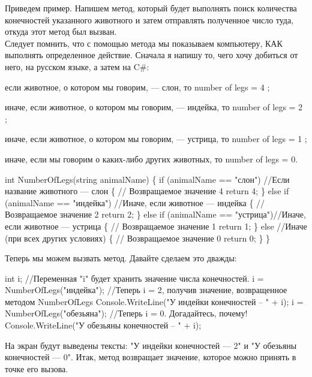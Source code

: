 \documentclass[12pt, a4paper]{article}
\begin{document}
Приведем пример. Напишем метод, который будет выполнять поиск количества конечностей указанного животного и затем отправлять полученное число туда, откуда этот метод был вызван.\\

Следует помнить, что с помощью метода мы показываем компьютеру, КАК выполнять определенное действие. Сначала я напишу то, чего хочу добиться от него, на русском языке, а затем на C\#:\\

\begin{itemize} {
\item{если животное, о котором мы говорим, — слон, то number of legs = 4 ;}
\item{иначе, если животное, о котором мы говорим, — индейка, то number of legs = 2 ;}
\item{иначе, если животное, о котором мы говорим, — устрица, то number of legs = 1 ;}
\item{иначе, если мы говорим о каких-либо других животных, то number of legs = 0.}
} \end{itemize}

\begin{spverbatim}int NumberOfLegs(string animalName)
\{
    if (animalName == "слон") //Если название животного — слон
    \{
        // Возвращаемое значение 4
        return 4;
    \}
    else if (animalName == "индейка") //Иначе, если животное — индейка
    \{
        // Возвращаемое значение 2
        return 2;
    \}
    else if (animalName == "устрица")//Иначе, если животное — устрица
    \{
        // Возвращаемое значение 1
        return 1;
    \}
    else //Иначе (при всех других условиях)
    \{
        // Возвращаемое значение 0
        return 0;
    \}
\}\end{spverbatim}

Теперь мы можем вызвать метод. Давайте сделаем это дважды:\\

\begin{spverbatim}int i;
    //Переменная "i" будет хранить значение числа конечностей.
i = NumberOfLegs("индейка");
    //Теперь i = 2, получив значение, возвращенное методом NumberOfLegs
Console.WriteLine("У индейки конечностей – " + i);
i = NumberOfLegs("обезьяна");
    //Теперь i = 0. Догадайтесь, почему!
Console.WriteLine("У обезьяны конечностей – " + i);\end{spverbatim}

На экран будут выведены тексты: "У индейки конечностей — 2" и "У обезьяны конечностей — 0". Итак, метод возвращает значение, которое можно принять в точке его вызова.\\
\end{document}

